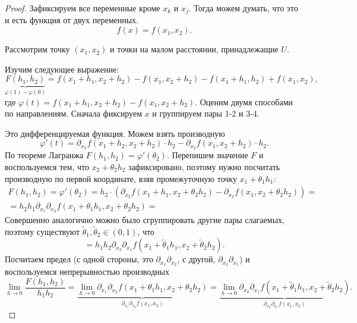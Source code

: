 \begin{proof}
    Зафиксируем все переменные кроме $ x_k$ и $ x_j$.
	Тогда можем думать, что это и есть функция от двух переменных.
    \[
	f(x) = f(x_1, x_2)
    .\] 

	Рассмотрим точку $ (x_1, x_2)$ и точки на малом расстоянии, принадлежащие $ U$.
\begin{figure}[ht]
    \centering
    \caption{}
    \label{fig:replace-diff}
\end{figure}
	Изучим следующее выражение:
    \[
	\underbrace{F(h_1, h_2)}_{ \varphi (1) - \varphi (0)} =
	f(x_1+h_1, x_2+h_2) - f(x_1, x_2+h_2) - f(x_1 + h_1, h_2) + f(x_1, x_2)
    ,\] 
    где $ \varphi (t) = f(x_1+h_1, x_2+h_2) - f(x_1, x_2+h_2)$.
	Оценим двумя способами по направлениям. Сначала фиксируем $ x$ и группируем пары 1-2 и 3-4.

    Это дифференцируемая функция. Можем взять производную
   \[
	\varphi '(t) = \partial _{x_2}f(x_1 + h_2, x_2+h_2) \cdot h_2 - \partial _{x_2}f(x_1, x_2+h_2)\cdot h_2 
    .\] 
	По теореме Лагранжа $ F(h_1, h_2) = \varphi '(\theta _2)$.
	Перепишем значение $ F$ и воспользуемся тем, что $ x_2+\theta _2 h_2$ зафиксировано, поэтому нужно посчитать производную по первой координате, взяв промежуточную точку $ x_1 + \theta _1 h_1$:
    $$
    \begin{aligned}
	F(h_1, h_2) = \varphi '( \theta_2) = h_2  \cdot \left( \partial _{x_2}f(x_1 + h_1, x_2+\theta_2 h_2) - \partial _{x_2}f(x_1, x_2+ \theta_2 h_2) \right)  = \\
	= h_2 h_1 \partial _{x_1} \partial _{x_2} f(x_1+ \theta _1 h_1, x_2+ \theta_2 h_2) = 
    \end{aligned}
    $$
	Совершенно аналогично можно было сгруппировать другие пары слагаемых, поэтому
	существуют $ \tilde \theta_1, \tilde \theta_2 \in (0, 1)$, что
    \[
	= h_1 h_2  \partial _{x_2} \partial _{x_1} f(x_1 + \tilde\theta_1 h_1, x_2+ \tilde\theta_2 h_2)
    .\] 
	Посчитаем предел (с одной стороны, это $ \partial _{x_1} \partial _{x_2}$, с другой, $ \partial _{x_{2}} \partial _{x_1}$) и воспользуемся непрерывностью производных
    \[
	\lim_{h \to  0} \frac{F(h_1, h_2)}{h_1h_2}  =
	\underbrace{\lim_{h \to  0} \partial _{x_1} \partial _{   x_2 }f(x_1 + \theta_1 h_1, x_2 + \theta_2 h_2)}_{\partial _{x_1} \partial _{x_2} f(x_1, x_2)} =
	\underbrace{\lim_{h \to  0} \partial _{x_2} \partial _{x_1} f(x_1 + \tilde \theta _1 h_1, x_2 + \tilde \theta_2 h_2) }_{\partial _{x_2} \partial _{x_1} f(x_1, x_2)}
    .\] 
\end{proof}

